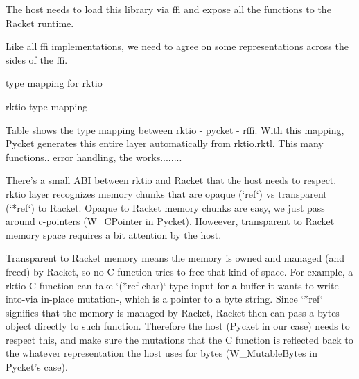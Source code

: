 				\begin{paragraph-here}%
					The host needs to load this library via ffi and expose all the functions to the Racket runtime.
				\end{paragraph-here}

				\begin{paragraph-here}%
					Like all ffi implementations, we need to agree on some representations across the sides of the ffi.
				\end{paragraph-here}

				\begin{table-here}
					type mapping for rktio

					\begin{todo}
						rktio type mapping
					\end{todo}
				\end{table-here}

				\begin{paragraph-here}%
					Table shows the type mapping between rktio - pycket - rffi. With this mapping, Pycket generates this entire layer automatically from rktio.rktl. This many functions.. error handling, the works........
				\end{paragraph-here}

				\begin{paragraph-here}%
					There's a small ABI between rktio and Racket that the host needs to respect. rktio layer recognizes memory chunks that are opaque (`ref`) vs transparent (`*ref`) to Racket. Opaque to Racket memory chunks are easy, we just pass around c-pointers (W\_CPointer in Pycket). Howeever, transparent to Racket memory space requires a bit attention by the host.
				\end{paragraph-here}

				\begin{paragraph-here}%
					Transparent to Racket memory means the memory is owned and managed (and freed) by Racket, so no C function tries to free that kind of space. For example, a rktio C function can take `(*ref char)` type input for a buffer it wants to write into-via in-place mutation-, which is a pointer to a byte string. Since `*ref` signifies that the memory is managed by Racket, Racket then can pass a bytes object directly to such function. Therefore the host (Pycket in our case) needs to respect this, and make sure the mutations that the C function is reflected back to the whatever representation the host uses for bytes (W\_MutableBytes in Pycket's case).
				\end{paragraph-here}

